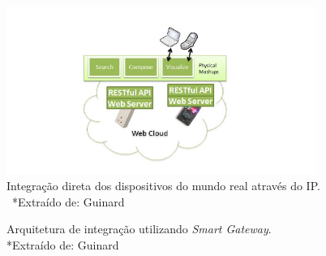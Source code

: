 \documentclass[12pt,a4paper,oneside]{report}
\begin{document}
\begin{figure}[h!]
   \centering
    \includegraphics[width=0.9\textwidth]{figuras/figura_2_4}
	\caption{Integração direta dos dispositivos do mundo real através do IP. \ *\footnotesize Extraído de: Guinard \cite{wotdovad}}
    \label{http-embarcado}
\end{figure}
\begin{figure}[h!]
   \centering
   \caption{Arquitetura de integração utilizando \emph{Smart Gateway}.\\ *\footnotesize Extraído de: Guinard \cite{wotdovad}}
    \label{http-centralizado}
\end{figure}
\end{document}
